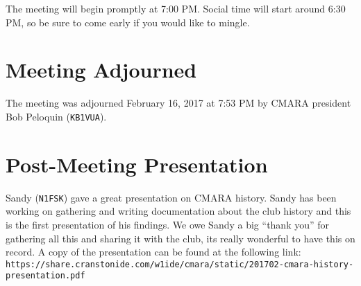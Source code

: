 \documentclass[10pt,letterpaper]{article}
\begin{document}
\noindent
The meeting will begin promptly at 7:00 PM. Social time will start around 6:30 PM, so be sure to come early if you would like to mingle.

\section{Meeting Adjourned}
The meeting was adjourned February 16, 2017 at 7:53 PM by CMARA president Bob Peloquin (\texttt{KB1VUA}).

\section{Post-Meeting Presentation}
Sandy (\texttt{N1FSK}) gave a great presentation on CMARA history. Sandy has been working on gathering and writing documentation about the club history and this is the first presentation of his findings. We owe Sandy a big ``thank you'' for gathering all this and sharing it with the club, its really wonderful to have this on record. A copy of the presentation can be found at the following link:\\

\noindent
\texttt{https://share.cranstonide.com/w1ide/cmara/static/201702-cmara-history-presentation.pdf}
\end{document}
